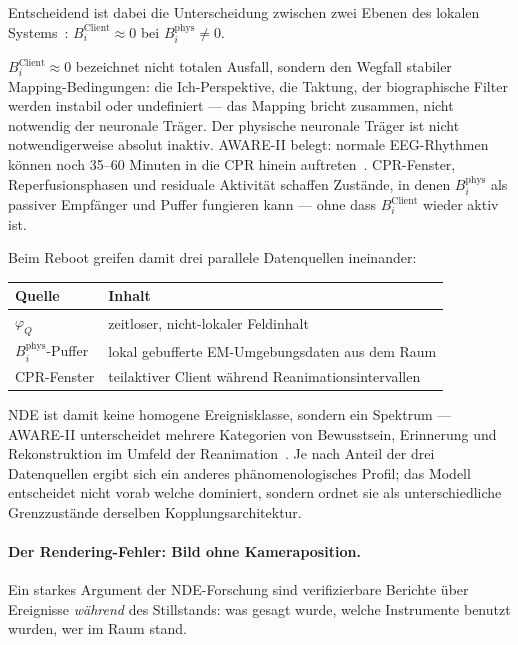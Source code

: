 \documentclass[11pt,a4paper]{article}
\begin{document}
Entscheidend ist dabei die Unterscheidung zwischen zwei Ebenen des lokalen
Systems~\citep{parnia2023}: $B_i^{\mathrm{Client}} \approx 0$ bei
$B_i^{\mathrm{phys}} \neq 0$.

$B_i^{\mathrm{Client}} \approx 0$ bezeichnet nicht totalen Ausfall, sondern
den Wegfall stabiler Mapping-Bedingungen: die Ich-Perspektive, die
Taktung, der biographische Filter werden instabil oder undefiniert —
das Mapping bricht zusammen, nicht notwendig der neuronale Träger.
Der physische neuronale Träger ist nicht notwendigerweise
absolut inaktiv. AWARE-II belegt: normale EEG-Rhythmen können noch 35--60
Minuten in die CPR hinein auftreten~\citep{parnia2023}. CPR-Fenster,
Reperfusionsphasen und residuale Aktivität schaffen Zustände, in denen
$B_i^{\mathrm{phys}}$ als passiver Empfänger und Puffer fungieren kann —
ohne dass $B_i^{\mathrm{Client}}$ wieder aktiv ist.

Beim Reboot greifen damit drei parallele Datenquellen ineinander:

\medskip
\begin{center}\small
\begin{tabular}{@{}ll@{}}
\toprule
Quelle & Inhalt \\
\midrule
$\varphi_Q$              & zeitloser, nicht-lokaler Feldinhalt \\
$B_i^{\mathrm{phys}}$-Puffer & lokal gebufferte EM-Umgebungsdaten aus dem Raum \\
CPR-Fenster              & teilaktiver Client während Reanimationsintervallen \\
\bottomrule
\end{tabular}
\end{center}
\medskip

NDE ist damit keine homogene Ereignisklasse, sondern ein Spektrum —
AWARE-II unterscheidet mehrere Kategorien von Bewusstsein, Erinnerung und
Rekonstruktion im Umfeld der Reanimation~\citep{parnia2023}. Je nach Anteil
der drei Datenquellen ergibt sich ein anderes phänomenologisches Profil;
das Modell entscheidet nicht vorab welche dominiert, sondern ordnet sie als
unterschiedliche Grenzzustände derselben Kopplungsarchitektur. \paragraph{Der Rendering-Fehler: Bild ohne Kameraposition.}
Ein starkes Argument der NDE-Forschung sind verifizierbare Berichte über
Ereignisse \emph{während} des Stillstands: was gesagt wurde, welche Instrumente
benutzt wurden, wer im Raum stand.
\end{document}
